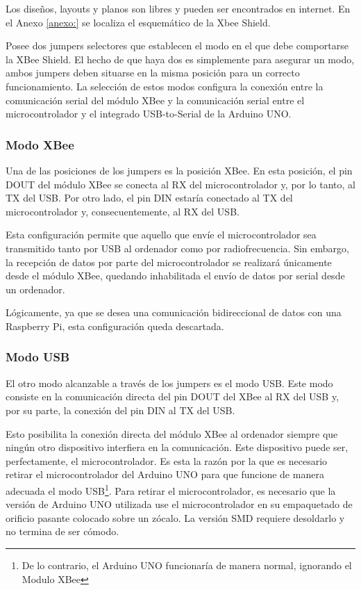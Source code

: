 Los diseños, layouts y planos son libres y pueden ser encontrados en internet. En el Anexo \ref{anexo:} se localiza el esquemático de la Xbee Shield.

Posee dos jumpers selectores que establecen el modo en el que debe comportarse la XBee Shield. El hecho de que haya dos es simplemente para asegurar un modo, ambos jumpers deben situarse en la misma posición para un correcto funcionamiento. La selección de estos modos configura la conexión entre la comunicación serial del módulo XBee y la comunicación serial entre el microcontrolador y el integrado USB-to-Serial de la Arduino UNO.

\subsubsection{Modo XBee}

Una de las posiciones de los jumpers es la posición XBee. En esta posición, el pin DOUT del módulo XBee se conecta al RX del microcontrolador y, por lo tanto, al TX del USB. Por otro lado, el pin DIN estaría conectado al TX del microcontrolador y, consecuentemente, al RX del USB.

Esta configuración permite que aquello que envíe el microcontrolador sea transmitido tanto por USB al ordenador como por radiofrecuencia. Sin embargo, la recepción de datos por parte del microcontrolador se realizará únicamente desde el módulo XBee, quedando inhabilitada el envío de datos por serial desde un ordenador.

Lógicamente, ya que se desea una comunicación bidireccional de datos con una Raspberry Pi, esta configuración queda descartada.

\subsubsection{Modo USB}

El otro modo alcanzable a través de los jumpers es el modo USB. Este modo consiste en la comunicación directa del pin DOUT del XBee al RX del USB y, por su parte, la conexión del pin DIN al TX del USB. 

Esto posibilita la conexión directa del módulo XBee al ordenador siempre que ningún otro dispositivo interfiera en la comunicación. Este dispositivo puede ser, perfectamente, el microcontrolador. Es esta la razón por la que es necesario retirar el microcontrolador del Arduino UNO para que funcione de manera adecuada el modo USB\footnote{De lo contrario, el Arduino UNO funcionaría de manera normal, ignorando el Modulo XBee}. Para retirar el microcontrolador, es necesario que la versión de Arduino UNO utilizada use el microcontrolador en su empaquetado de orificio pasante colocado sobre un zócalo. La versión SMD requiere desoldarlo y no termina de ser cómodo.

